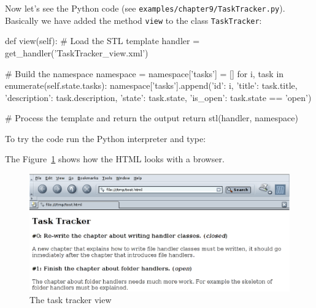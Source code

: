 Now let's see the Python code (see {\tt examples/chapter9/TaskTracker.py}).
Basically we have added the method {\tt view} to the class {\tt TaskTracker}:

\begin{code}
    def view(self):
        # Load the STL template
        handler = get_handler('TaskTracker_view.xml')

        # Build the namespace
        namespace = {}
        namespace['tasks'] = []
        for i, task in enumerate(self.state.tasks):
            namespace['tasks'].append({'id': i,
                                       'title': task.title,
                                       'description': task.description,
                                       'state': task.state,
                                       'is_open': task.state == 'open'})

        # Process the template and return the output
        return stl(handler, namespace)
\end{code}

To try the code run the Python interpreter and type:


The Figure~\ref{Figure: task tracker} shows how the HTML looks with a
browser.

\begin{figure}
  \center
  \includegraphics[width=\textwidth]{task_tracker.eps}
  \caption{The task tracker view}
  \label{Figure: task tracker}
\end{figure}

